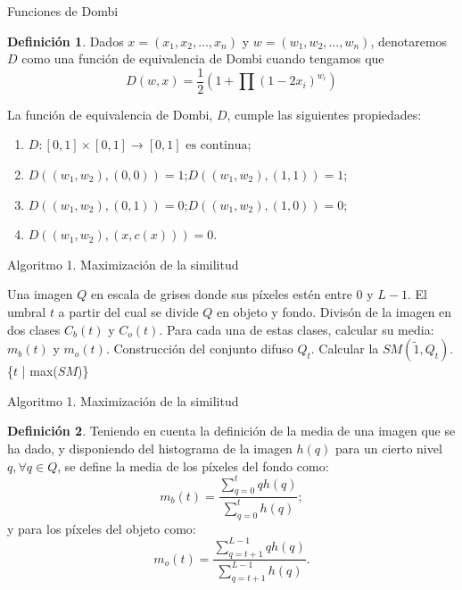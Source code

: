 \documentclass{beamer}
\theoremstyle{plain} %
\theoremstyle{definition}
\newtheorem{defn}{Definición}
\def\unitinterval{[0,1]}
\def\tilda1{\tilde{1}}
\newcommand{\unitspace}{\unitinterval \rightarrow \unitinterval}
\begin{document}
\begin{frame}[squeeze]{Funciones de Dombi}
  \begin{defn}\label{def:dombi}
  Dados $x=(x_1, x_2, \dots,x_n)$ y $w=(w_1,w_2,\dots,w_n)$, denotaremos $D$ como una función de equivalencia de Dombi cuando tengamos que
  $$D(w,x)=\frac{1}{2}\left(1+\prod(1-2x_{i})^{w_{i}}\right)$$
  \end{defn}
  \begin{block}{}\label{def:propiedadesdombi}
  La función de equivalencia de Dombi, $D$, cumple las siguientes propiedades:
  \begin{enumerate}
    \item $D:\unitinterval\times\unitspace \text{ es continua}$;
    \item $D((w_1,w_2),(0,0)) = 1$;\quad$D((w_1,w_2),(1,1)) = 1$;
    \item $D((w_1,w_2),(0,1)) = 0$;\quad$D((w_1,w_2),(1,0)) = 0$;
    \item $D((w_1,w_2),(x,c(x))) = 0$.
  \end{enumerate}
  \end{block}
\end{frame}

\begin{frame}{Algoritmo 1. Maximización de la similitud}
  \begin{algorithm}[H]%
  \begin{algorithmic}[1]
  \REQUIRE Una imagen $Q$ en escala de grises donde sus píxeles estén entre $0$ y $L-1$.
  \ENSURE El umbral $t$ a partir del cual se divide $Q$ en objeto y fondo.
  \STATE Divisón de la imagen en dos clases $C_b(t)$ y $C_o(t)$. Para cada una de estas clases, calcular su media: $m_b(t)$ y $m_o(t)$.
  \STATE Construcción del conjunto difuso $Q_t$.
  \STATE Calcular la $SM(\tilda1, Q_t)$. \label{lin:alg1:similitud}
  \ENDFOR
  \RETURN \{$t$ | max($SM$)\}
  \end{algorithmic}
  \caption{Maximización de la similitud}\label{alg:algoritmo1}
  \end{algorithm}
\end{frame}

\begin{frame}{Algoritmo 1. Maximización de la similitud}
  \begin{defn}\label{def:mediasmonoumbral}
Teniendo en cuenta la definición de la media de una imagen que se ha dado, y disponiendo del histograma de la imagen $h(q)$ para un cierto nivel $q, \forall q\in Q$, se define la media de los píxeles del fondo como:
$$m_b(t)=\frac{\sum_{q=0}^{t}qh(q)}{\sum_{q=0}^{t}h(q)};$$
y para los píxeles del objeto como:
$$m_o(t)=\frac{\sum_{q=t+1}^{L-1}qh(q)}{\sum_{q=t+1}^{L-1}h(q)}.$$
\end{defn}
\end{frame}
\end{document}
